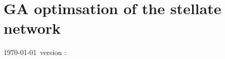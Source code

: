 \documentclass[11pt,a4paper,twoside,openright]{book}
\begin{document}
		{%
			\singlespacing%
			\tableofcontents%
                        \printglossaries
		   \clearpage%
		}%


\setcounter{chapter}{4}
\chapter[GAChapter]{GA optimsation of the {\CN} stellate network}
\label{sec:GAChapter}

\vspace{5cm}
{\centering \today\, version :}

\newpage

{\small{}}
\newpage

\newpage

\newpage

\newpage





 

\newpage
\listoftodos
\end{document}

